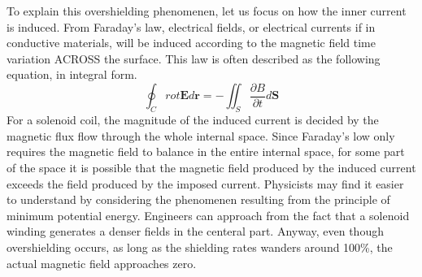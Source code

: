 To explain this overshielding phenomenen, let us focus on how the inner current is induced.
From Faraday's law, electrical fields, or electrical currents if in conductive materials,
will be induced according to the magnetic field time variation ACROSS the surface.
This law is often described as the following equation, in integral form.
\begin{equation}
  \oint_{C} rot\mathbf{E}d\mathbf{r} = -\iint_{S}\frac{\partial B}{\partial t}d\mathbf{S}
\end{equation}
For a solenoid coil, the magnitude of the induced current is decided by the magnetic flux flow through the whole internal space.
Since Faraday's low only requires the magnetic field to balance in the entire internal space,
for some part of the space it is possible that the magnetic field produced by the induced current exceeds the field produced by the imposed current.
Physicists may find it easier to understand by considering the phenomenen resulting from the principle of minimum potential energy.
Engineers can approach from the fact that a solenoid winding generates a denser fields in the centeral part.
Anyway, even though overshielding occurs, as long as the shielding rates wanders around 100\%,
the actual magnetic field approaches zero.


